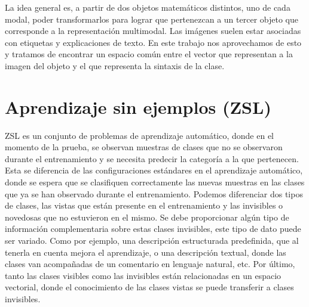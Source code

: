 La idea general es, a partir de dos objetos matemáticos distintos, uno de cada modal, poder transformarlos para lograr que pertenezcan a un tercer objeto que corresponde a la representación multimodal. Las imágenes suelen estar asociadas con etiquetas y explicaciones de texto. En este trabajo nos aprovechamos de esto y tratamos de encontrar un espacio común entre el vector que representan a la imagen del objeto y el que representa la sintaxis de la clase.

\section {Aprendizaje sin ejemplos (ZSL)} \label{sec:aprendizajepordisparocero}
ZSL es un conjunto de problemas de aprendizaje automático, donde en el momento de la prueba, se observan muestras de clases que no se observaron durante el entrenamiento y se necesita predecir la categoría a la que pertenecen. Esta se diferencia de las configuraciones estándares en el aprendizaje automático, donde se espera que se clasifiquen correctamente las nuevas muestras en las clases que ya se han observado durante el entrenamiento.
Podemos diferenciar dos tipos de clases, las vistas que están presente en el entrenamiento y las invisibles o novedosas que no estuvieron en el mismo. Se debe proporcionar algún tipo de información complementaria sobre estas clases invisibles, este tipo de dato puede ser variado. Como por ejemplo, una descripción estructurada predefinida, que al tenerla en cuenta mejora el aprendizaje, o una descripción textual, donde las clases van acompañadas de un comentario en lenguaje natural, etc. Por último, tanto las clases visibles como las invisibles están relacionadas en un espacio vectorial, donde el conocimiento de las clases vistas se puede transferir a clases invisibles.\\

